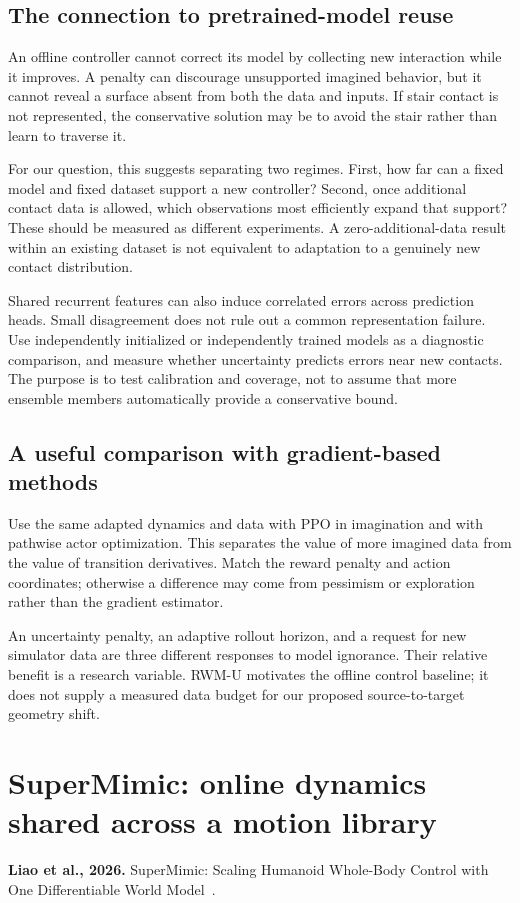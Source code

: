 \subsection{The connection to pretrained-model reuse}
An offline controller cannot correct its model by collecting new interaction
while it improves. A penalty can discourage unsupported imagined behavior, but
it cannot reveal a surface absent from both the data and inputs. If stair contact
is not represented, the conservative solution may be to avoid the stair rather
than learn to traverse it.

For our question, this suggests separating two regimes. First, how far can a
fixed model and fixed dataset support a new controller? Second, once additional
contact data is allowed, which observations most efficiently expand that support?
These should be measured as different experiments. A zero-additional-data
result within an existing dataset is not equivalent to adaptation to a genuinely
new contact distribution.

Shared recurrent features can also induce correlated errors across prediction
heads. Small disagreement does not rule out a common representation failure.
Use independently initialized or independently trained models as a diagnostic
comparison, and measure whether uncertainty predicts errors near new contacts.
The purpose is to test calibration and coverage, not to assume that more ensemble
members automatically provide a conservative bound.

\subsection{A useful comparison with gradient-based methods}
Use the same adapted dynamics and data with PPO in imagination and with pathwise
actor optimization. This separates the value of more imagined data from the
value of transition derivatives. Match the reward penalty and action coordinates;
otherwise a difference may come from pessimism or exploration rather than the
gradient estimator.

An uncertainty penalty, an adaptive rollout horizon, and a request for new
simulator data are three different responses to model ignorance. Their relative
benefit is a research variable. RWM-U motivates the offline control baseline;
it does not supply a measured data budget for our proposed source-to-target
geometry shift.

\section{SuperMimic: online dynamics shared across a motion library}\label{sec:supermimic}
\textbf{Liao et al., 2026.} SuperMimic: Scaling Humanoid Whole-Body Control
with One Differentiable World Model~\cite{supermimic}.

